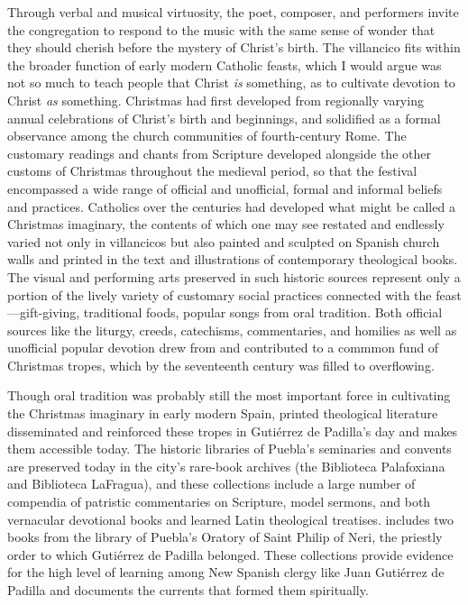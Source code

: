 Through verbal and musical virtuosity, the poet, composer, and performers invite
the congregation to respond to the music with the same sense of wonder that they
should cherish before the mystery of Christ's birth.
The villancico fits within the broader function of early modern Catholic
feasts, which I would argue was not so much to teach people that Christ
\emph{is} something, as to cultivate devotion to Christ \emph{as} something.
Christmas had first developed from regionally varying annual celebrations of
Christ's birth and beginnings, and solidified as a formal observance among the
church communities of fourth-century Rome.%
    \Autocites
    [85--140]{Talley:LiturgicalYear}
    [86--89]{Bradshaw:EarlyWorship}
    {Roll:OriginsChristmas}
The customary readings and chants from Scripture developed alongside the other
customs of Christmas throughout the medieval period, so that the festival
encompassed a wide range of official and unofficial, formal and informal beliefs
and practices.
Catholics over the centuries had developed what might be called a Christmas
imaginary, the contents of which one may see restated and endlessly varied not
only in villancicos but also painted and sculpted on Spanish church walls and
printed in the text and illustrations of contemporary theological books.
The visual and performing arts preserved in such historic sources represent only
a portion of the lively variety of customary social practices connected with the
feast---gift-giving, traditional foods, popular songs from oral tradition.
Both official sources like the liturgy, creeds, catechisms, commentaries, and
homilies as well as unofficial popular devotion drew from and contributed to a
commmon fund of Christmas tropes, which by the seventeenth century was filled to
overflowing.

Though oral tradition was probably still the most important force in cultivating
the Christmas imaginary in early modern Spain, printed theological literature
disseminated and reinforced these tropes in Gutiérrez de Padilla's day and makes
them accessible today.
The historic libraries of Puebla's seminaries and convents are preserved today
in the city's rare-book archives (the Biblioteca Palafoxiana and Biblioteca
LaFragua), and these collections include a large number of compendia of
patristic commentaries on Scripture, model sermons, and both vernacular
devotional books and learned Latin theological treatises.%
    \Autocites
    [On patristic exegesis and its influence, see][]
    {Kannengiesser:PatristicExegesis}
    {McKim:BiblicalInterpreters}
    {Thompson:ReadingwDead}
 includes two books from the library of Puebla's
Oratory of Saint Philip of Neri, the priestly order to which Gutiérrez de
Padilla belonged.%
    \Autocite{Mauleon:PadillaCivil}
These collections provide evidence for the high level of learning among New
Spanish clergy like Juan Gutiérrez de Padilla and documents the currents that
formed them spiritually.


